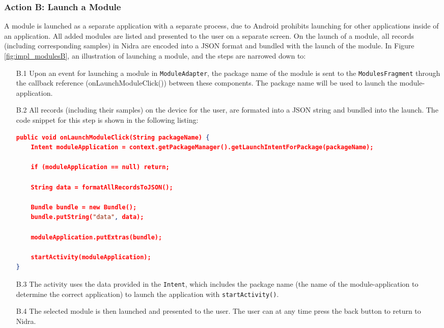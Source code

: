 \subsubsection{Action B: Launch a Module}
A module is launched as a separate application with a separate process, due to Android prohibits launching for other applications inside of an application. All added modules are listed and presented to the user on a separate screen. On the launch of a module, all records (including corresponding samples) in Nidra are encoded into a JSON format and bundled with the launch of the module. In Figure \ref{fig:impl_modulesB}, an illustration of launching a module, and the steps are narrowed down to:

\begin{itemize}
    \item[B.1] Upon an event for launching a module in \verb|ModuleAdapter|, the package name of the module is sent to the \verb|ModulesFragment| through the callback reference (onLaunchModuleClick()) between these components. The package name will be used to launch the module-application.
    \item[B.2] All records (including their samples) on the device for the user, are formated into a JSON string and bundled into the launch. The code snippet for this step is shown in the following listing:
\begin{lstlisting}[language=json, caption={}, captionpos=b]
public void onLaunchModuleClick(String packageName) {
    Intent moduleApplication = context.getPackageManager().getLaunchIntentForPackage(packageName);

    if (moduleApplication == null) return;

    String data = formatAllRecordsToJSON();

    Bundle bundle = new Bundle();
    bundle.putString("data", data);

    moduleApplication.putExtras(bundle);

    startActivity(moduleApplication);
}
\end{lstlisting}

    \item[B.3] The activity uses the data provided in the \verb|Intent|, which includes the package name (the name of the module-application to determine the correct application) to launch the application with \verb|startActivity()|.
    \item[B.4] The selected module is then launched and presented to the user. The user can at any time press the back button to return to Nidra.  
\end{itemize}

